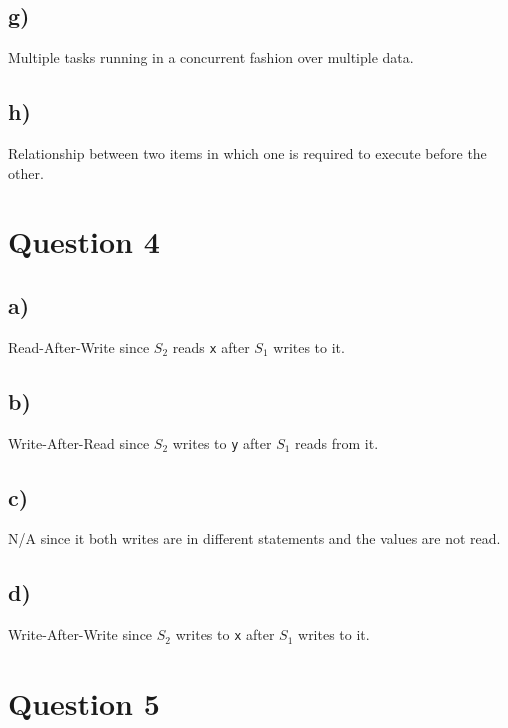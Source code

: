 \documentclass[a4paper, twocolumn]{article}
\begin{document}
\subsection{g)}
Multiple tasks running in a concurrent fashion over multiple data.

\subsection{h)}
Relationship between two items in which one is required to execute before the other.

\section{Question 4}
\subsection{a)}
Read-After-Write since $S_2$ reads \texttt{x} after $S_1$ writes to it.

\subsection{b)}
Write-After-Read since $S_2$ writes to \texttt{y} after $S_1$ reads from it.

\subsection{c)}
N/A since it both writes are in different statements and the values are not read.

\subsection{d)}
Write-After-Write since $S_2$ writes to \texttt{x} after $S_1$ writes to it.

\section{Question 5}
\begin{figure}[h]
    \centering
    \label{}
\end{figure}
\end{document}
